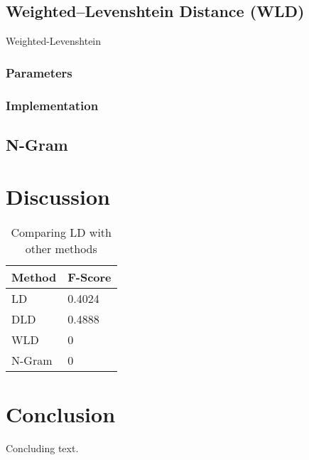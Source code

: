 \documentclass[11pt]{article}
\begin{document}
\subsection{Weighted–Levenshtein Distance (WLD)}
Weighted-Levenshtein 

\subsubsection{Parameters}

\subsubsection{Implementation}



 
\subsection{N-Gram}

\section{Discussion}

\begin{table}[h]
\begin{center}
\begin{tabular}{| l | l |}

      \hline
      Method & F-Score \\
      \hline\hline
      LD & 0.4024 \\
      DLD & 0.4888 \\
      WLD & 0 \\
      N-Gram &  0 \\
      \hline
\end{tabular}

\caption{Comparing LD with other methods}\label{table4}
\end{center}
\end{table}


\section{Conclusion}

Concluding text.



\end{document}
